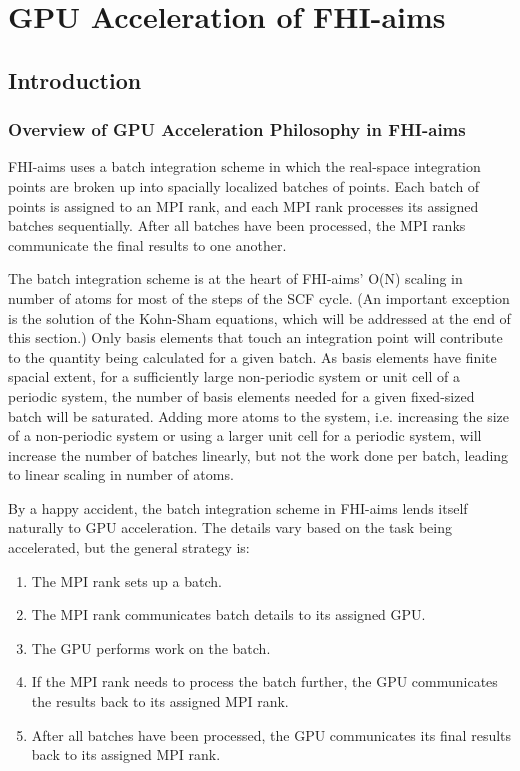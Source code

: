 \chapter{GPU Acceleration of FHI-aims}
\label{Sex:appendix_gpu_acceleration}

\section{Introduction}

\subsection{Overview of GPU Acceleration Philosophy in FHI-aims}

FHI-aims uses a batch integration scheme\cite{Havu08} in which the real-space integration points are broken up into spacially localized batches of points.  Each batch of points is assigned to an MPI rank, and each MPI rank processes its assigned batches sequentially.  After all batches have been processed, the MPI ranks communicate the final results to one another.

The batch integration scheme is at the heart of FHI-aims' O(N) scaling in number of atoms for most of the steps of the SCF cycle.  (An important exception is the solution of the Kohn-Sham equations, which will be addressed at the end of this section.)  Only basis elements that touch an integration point will contribute to the quantity being calculated for a given batch.  As basis elements have finite spacial extent, for a sufficiently large non-periodic system or unit cell of a periodic system, the number of basis elements needed for a given fixed-sized batch will be saturated.   Adding more atoms to the system, i.e. increasing the size of a non-periodic system or using a larger unit cell for a periodic system, will increase the number of batches linearly, but not the work done per batch, leading to linear scaling in number of atoms.  

By a happy accident, the batch integration scheme in FHI-aims lends itself naturally to GPU acceleration.  The details vary based on the task being accelerated, but the general strategy is:
\begin{enumerate}
	\item The MPI rank sets up a batch.
	\item The MPI rank communicates batch details to its assigned GPU.
	\item The GPU performs work on the batch.
	\item If the MPI rank needs to process the batch further, the GPU communicates the results back to its assigned MPI rank.
	\item After all batches have been processed, the GPU communicates its final results back to its assigned MPI rank.
\end{enumerate}

